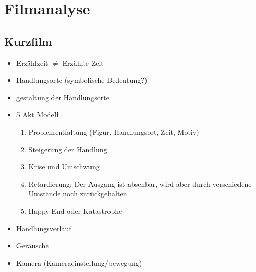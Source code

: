 
\section{Filmanalyse}


\subsection{Kurzfilm}

\begin{itemize}
    \item Erzählzeit $\neq$ Erzählte Zeit
    \item Handlungsorte (symbolische Bedeutung?)
    \item gestaltung der Handlungsorte
    \item 5 Akt Modell
    \begin{enumerate}
        \item Problementfaltung (Figur, Handlungsort, Zeit, Motiv)
        \item Steigerung der Handlung
        \item Krise und Umschwung
        \item Retardierung: Der Ausgang ist absehbar, wird aber durch verschiedene Umstände noch zurückgehalten
        \item Happy End oder Katastrophe
    \end{enumerate}
    \item Handlungsverlauf
    \item Geräusche
    \item Kamera (Kameraeinstellung/bewegung)
\end{itemize}

